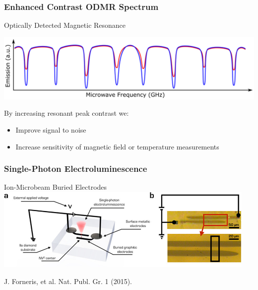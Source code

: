 \documentclass{beamer}
\begin{document}
\begin{frame}\frametitle{Enhanced Contrast ODMR Spectrum}
    \begin{block}{Optically Detected Magnetic Resonance}
        \begin{center}
        \includegraphics[width=1.0\textwidth]{Images/ODMR.png}
        \end{center}
        By increasing resonant peak contrast we:
        \begin{itemize}
            \item Improve signal to noise
            \item Increase sensitivity of magnetic field or temperature measurements
        \end{itemize}
    \end{block}
\end{frame}

\begin{frame}\frametitle{Single-Photon Electroluminescence}
    \begin{block}{Ion-Microbeam Buried Electrodes}
        \centering
        \includegraphics[width=0.95\textwidth]{Images/Electrolumin.jpg}

        J. Forneris, et al. Nat. Publ. Gr. 1 (2015).
    \end{block}
\end{frame}
\end{document}
